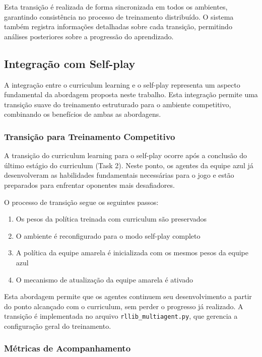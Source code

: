 Esta transição é realizada de forma sincronizada em todos os ambientes, garantindo consistência no processo de treinamento distribuído. O sistema também registra informações detalhadas sobre cada transição, permitindo análises posteriores sobre a progressão do aprendizado.

\subsection{Integração com Self-play}
\label{subsec:integracao_selfplay}

A integração entre o curriculum learning e o self-play representa um aspecto fundamental da abordagem proposta neste trabalho. Esta integração permite uma transição suave do treinamento estruturado para o ambiente competitivo, combinando os benefícios de ambas as abordagens.

\subsubsection{Transição para Treinamento Competitivo}

A transição do curriculum learning para o self-play ocorre após a conclusão do último estágio do curriculum (Task 2). Neste ponto, os agentes da equipe azul já desenvolveram as habilidades fundamentais necessárias para o jogo e estão preparados para enfrentar oponentes mais desafiadores.

O processo de transição segue os seguintes passos:

\begin{enumerate}
    \item Os pesos da política treinada com curriculum são preservados
    \item O ambiente é reconfigurado para o modo self-play completo
    \item A política da equipe amarela é inicializada com os mesmos pesos da equipe azul
    \item O mecanismo de atualização da equipe amarela é ativado
\end{enumerate}

Esta abordagem permite que os agentes continuem seu desenvolvimento a partir do ponto alcançado com o curriculum, sem perder o progresso já realizado. A transição é implementada no arquivo \texttt{rllib\_multiagent.py}, que gerencia a configuração geral do treinamento.

\subsubsection{Métricas de Acompanhamento}

